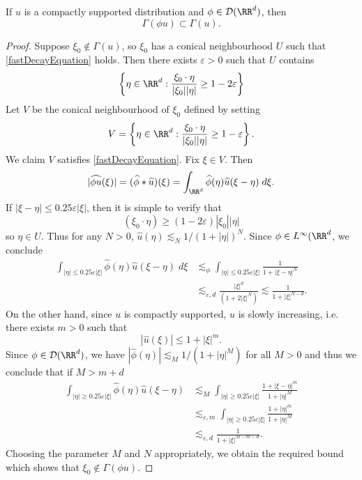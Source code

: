 \begin{lemma} \label{wavefrontlocalizationlemma}
  If $u$ is a compactly supported distribution and $\phi \in \mathcal{D}(\RR^d)$, then
  \[ \Gamma(\phi u) \subset \Gamma(u). \]
\end{lemma}
\begin{proof}
  Suppose $\xi_0 \not \in \Gamma(u)$, so $\xi_0$ has a conical neighbourhood $U$ such that \eqref{fastDecayEquation} holds. Then there exists $\varepsilon > 0$ such that $U$ contains
  \[ \left\{ \eta \in \RR^d : \frac{\xi_0 \cdot \eta}{|\xi_0| |\eta|} \geq 1 - 2\varepsilon \right\} \]
  Let $V$ be the conical neighbourhood of $\xi_0$ defined by setting
  \[ V = \left\{ \eta \in \RR^d : \frac{\xi_0 \cdot \eta}{|\xi_0| |\eta|} \geq 1 - \varepsilon \right\}. \]
  We claim $V$ satisfies \eqref{fastDecayEquation}. Fix $\xi \in V$. Then
  \[ |\widehat{\phi u}(\xi)| = (\widehat{\phi} * \widehat{u})(\xi) = \int_{\RR^d} \widehat{\phi}(\eta) \widehat{u}(\xi - \eta)\; d\xi. \]
  If $|\xi - \eta| \leq 0.25 \varepsilon |\xi|$, then it is simple to verify that
  \[ (\xi_0 \cdot \eta) \geq (1 - 2\varepsilon) |\xi_0| |\eta| \]
  so $\eta \in U$. Thus for any $N > 0$, $\widehat{u}(\eta) \lesssim_N 1/(1 + |\eta|)^N$. Since $\phi \in L^\infty(\RR^d$, we conclude
  \begin{align*}
    \int_{|\eta| \leq 0.25 \varepsilon |\xi|} \widehat{\phi}(\eta) \widehat{u}(\xi - \eta)\; d\xi &\lesssim_{\phi} \int_{|\eta| \leq 0.25 \varepsilon |\xi|} \frac{1}{1 + |\xi - \eta|^N}\\
    &\lesssim_{\varepsilon,d} \frac{|\xi|^d}{(1 + 2 |\xi|^{N})} \lesssim \frac{1}{1 + |\xi|^{N-d}}.
  \end{align*}
  On the other hand, since $u$ is compactly supported, $\widehat{u}$ is slowly increasing, i.e. there exists $m > 0$ such that
  \[ |\widehat{u}(\xi)| \leq 1 + |\xi|^m. \]
  Since $\phi \in \mathcal{D}(\RR^d)$, we have $|\widehat{\phi}(\eta)| \lesssim_M 1/(1 + |\eta|^M)$ for all $M > 0$ and thus we conclude that if $M > m + d$
  \begin{align*}
    \int_{|\eta| \geq 0.25 \varepsilon |\xi|} \widehat{\phi}(\eta) \widehat{u}(\xi - \eta) &\lesssim_M \int_{|\eta| \geq 0.25 \varepsilon |\xi|} \frac{1 + |\xi - \eta|^m}{1 + |\eta|^M}\\
    &\lesssim_{\varepsilon,m} \int_{|\eta| \geq 0.25 \varepsilon |\xi|} \frac{1 + |\eta|^m}{1 + |\eta|^M}\\
    &\lesssim_{\varepsilon,d} \frac{1}{1 + |\xi|^{M-m-d}}.
  \end{align*}
  Choosing the parameter $M$ and $N$ appropriately, we obtain the required bound which shows that $\xi_0 \not \in \Gamma(\phi u)$.
\end{proof}


